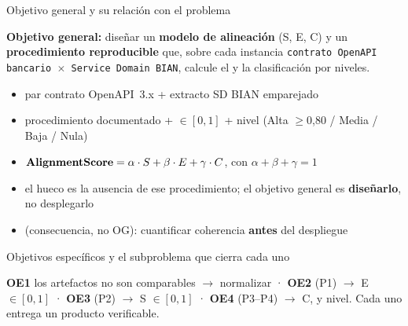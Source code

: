 \documentclass[aspectratio=169,11pt,spanish]{beamer}
\begin{document}
\begin{frame}{Objetivo general y su relación con el problema}
  \begin{planstatement}
  \textbf{Objetivo general:} diseñar un \textbf{modelo de alineación} (S, E, C) y un \textbf{procedimiento reproducible} que, sobre cada instancia \texttt{contrato OpenAPI bancario $\times$ Service Domain BIAN}, calcule el \AlignmentScore{} y la clasificación por niveles.
  \end{planstatement}
  \vspace{0.12em}
  \begin{planpanel}
  \small
  \begin{itemize}
    \item {} par contrato OpenAPI~3.x + extracto SD BIAN emparejado
    \item {} procedimiento documentado + \AlignmentScore{} $\in [0,1]$ + nivel (Alta $\geq$0{,}80 / Media / Baja / Nula)
    \item {} $\textbf{AlignmentScore} = \alpha\cdot S + \beta\cdot E + \gamma\cdot C$, con $\alpha+\beta+\gamma=1$
    \item {} el hueco es la ausencia de ese procedimiento; el objetivo general es \textbf{diseñarlo}, no desplegarlo
    \item {} (consecuencia, no OG): cuantificar coherencia \textbf{antes} del despliegue
  \end{itemize}
  \end{planpanel}
\end{frame}

\begin{frame}{Objetivos específicos y el subproblema que cierra cada uno}
  \vspace{0.1em}
  \begin{planpanel}
  \footnotesize
  \textbf{OE1} los artefactos no son comparables $\rightarrow$ normalizar · \textbf{OE2} (P1) $\rightarrow$ E $\in [0,1]$ · \textbf{OE3} (P2) $\rightarrow$ S $\in [0,1]$ · \textbf{OE4} (P3--P4) $\rightarrow$ C, \AlignmentScore{} y nivel. Cada uno entrega un producto verificable.
  \end{planpanel}
\end{frame}
\end{document}
